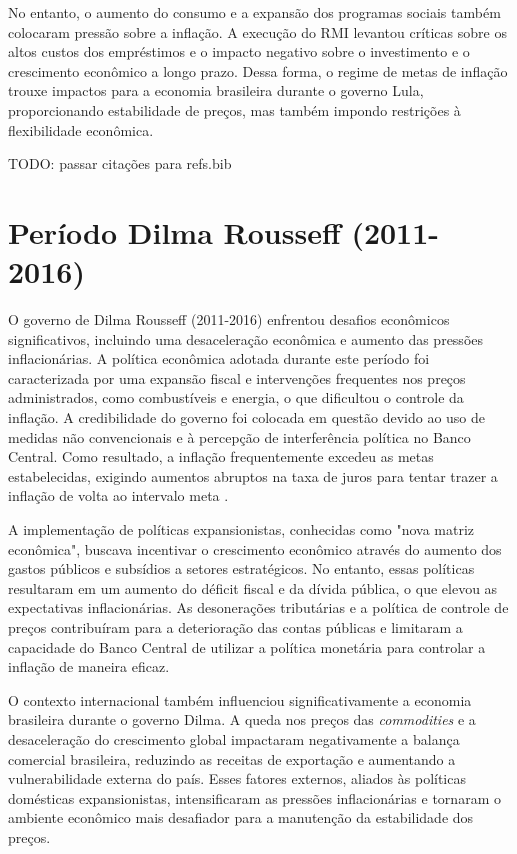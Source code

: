 \documentclass[12pt,oneside,a4paper,chapter=TITLE,english,brazil,sumario=abnt-6027-2012]{abntex2}
\begin{document}
No entanto, o aumento do consumo e a expansão dos programas sociais também colocaram pressão sobre a inflação. A execução do RMI levantou críticas sobre os altos custos dos empréstimos e o impacto negativo sobre o investimento e o crescimento econômico a longo prazo. Dessa forma, o regime de metas de inflação trouxe impactos para a economia brasileira durante o governo Lula, proporcionando estabilidade de preços, mas também impondo restrições à flexibilidade econômica.

TODO: passar citações para refs.bib

\section{Período Dilma Rousseff (2011-2016)}
O governo de Dilma Rousseff (2011-2016) enfrentou desafios econômicos significativos, incluindo uma desaceleração econômica e aumento das pressões inflacionárias. A política econômica adotada durante este período foi caracterizada por uma expansão fiscal e intervenções frequentes nos preços administrados, como combustíveis e energia, o que dificultou o controle da inflação. A credibilidade do governo foi colocada em questão devido ao uso de medidas não convencionais e à percepção de interferência política no Banco Central. Como resultado, a inflação frequentemente excedeu as metas estabelecidas, exigindo aumentos abruptos na taxa de juros para tentar trazer a inflação de volta ao intervalo meta \cite{carvalho_2016_growth}.

A implementação de políticas expansionistas, conhecidas como "nova matriz econômica", buscava incentivar o crescimento econômico através do aumento dos gastos públicos e subsídios a setores estratégicos. No entanto, essas políticas resultaram em um aumento do déficit fiscal e da dívida pública, o que elevou as expectativas inflacionárias. As desonerações tributárias e a política de controle de preços contribuíram para a deterioração das contas públicas e limitaram a capacidade do Banco Central de utilizar a política monetária para controlar a inflação de maneira eficaz.

O contexto internacional também influenciou significativamente a economia brasileira durante o governo Dilma. A queda nos preços das \textit{commodities} e a desaceleração do crescimento global impactaram negativamente a balança comercial brasileira, reduzindo as receitas de exportação e aumentando a vulnerabilidade externa do país. Esses fatores externos, aliados às políticas domésticas expansionistas, intensificaram as pressões inflacionárias e tornaram o ambiente econômico mais desafiador para a manutenção da estabilidade dos preços.
\end{document}
